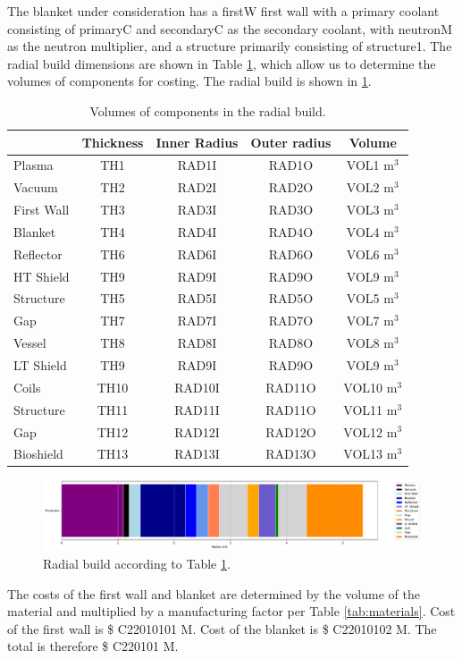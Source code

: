 The blanket under consideration has a firstW first wall with a primary coolant consisting of primaryC and secondaryC as the secondary coolant, with neutronM as the neutron multiplier, and a structure primarily consisting of structure1. The radial build dimensions are shown in Table \ref{tab:volumes}, which allow us to determine the volumes of components for costing.  The radial build is shown in \ref{fig:radial}.  \\


\begin{table}[h!]
    \centering
    \begin{tabular}{l c  c c c}
    \hline
        &	Thickness	&	Inner Radius	&	Outer radius	&	Volume		\\
        \hline
Plasma	&	TH1	&	RAD1I	&	RAD1O	&	VOL1	m$^{3}$	\\
Vacuum	&	TH2	&	RAD2I	&	RAD2O	&	VOL2	m$^{3}$	\\
First Wall	&	TH3	&	RAD3I	&	RAD3O	&	VOL3	m$^{3}$	\\
Blanket	&	TH4	&	RAD4I	&	RAD4O	&	VOL4	m$^{3}$	\\
Reflector	&	TH6	&	RAD6I	&	RAD6O	&	VOL6	m$^{3}$	\\
HT Shield	&	TH9	&	RAD9I	&	RAD9O	&	VOL9	m$^{3}$	\\
Structure	&	TH5	&	RAD5I	&	RAD5O	&	VOL5	m$^{3}$	\\
Gap	&	TH7	&	RAD7I	&	RAD7O	&	VOL7	m$^{3}$	\\
Vessel	&	TH8	&	RAD8I	&	RAD8O	&	VOL8	m$^{3}$	\\
LT Shield	&	TH9	&	RAD9I	&	RAD9O	&	VOL9	m$^{3}$	\\
Coils	&	TH10	&	RAD10I	&	RAD11O	&	VOL10	m$^{3}$	\\
Structure	&	TH11	&	RAD11I	&	RAD11O	&	VOL11	m$^{3}$	\\
Gap	&	TH12	&	RAD12I	&	RAD12O	&	VOL12	m$^{3}$	\\
Bioshield	&	TH13	&	RAD13I	&	RAD13O	&	VOL13	m$^{3}$	\\

        \hline
    \end{tabular}
    \caption{Volumes of components in the radial build.}
    \label{tab:volumes}
\end{table}

\begin{figure}
    \centering
    \includegraphics[width=0.9\linewidth]{Figures/radial_build.pdf}
    \caption{Radial build according to Table \ref{tab:volumes}.}
    \label{fig:radial}
\end{figure}



The costs of the first wall and blanket are determined by the volume of the material and multiplied by a manufacturing factor per Table \ref{tab:materials}.   Cost of the first wall is \$ C22010101 M.  Cost of the blanket is \$ C22010102 M. The total is therefore \$ C220101 M.

